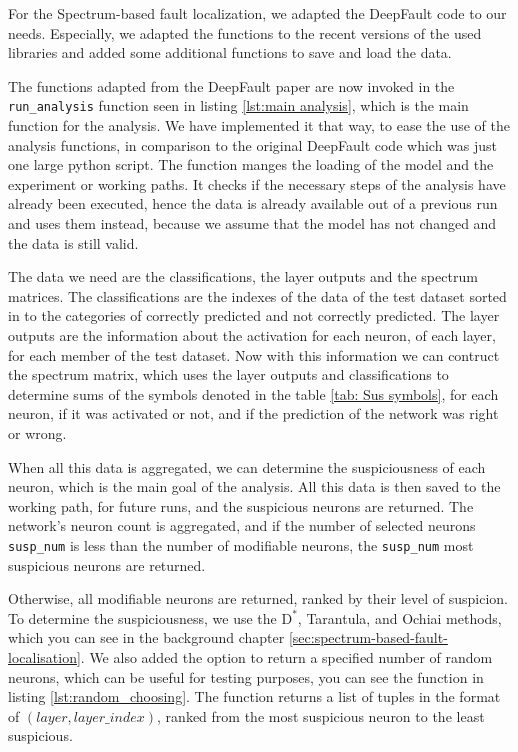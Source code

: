 For the Spectrum-based fault localization, we adapted the DeepFault \cite{eniser_deepfault_2023} code to our needs.
Especially, we adapted the functions to the recent versions of the used libraries and added some additional functions to save and load the data.

The functions adapted from the DeepFault paper are now invoked in the \texttt{run\_analysis} function seen in listing \ref{lst:main analysis}, which is the main function for the analysis.
We have implemented it that way, to ease the use of the analysis functions, in comparison to the original DeepFault code which was just one large python script.
The function manges the loading of the model and the experiment or working paths.
It checks if the necessary steps of the analysis have already been executed, hence the data is already available out of a previous run and uses them instead, because we assume that the model has not changed and the data is still valid.

The data we need are the classifications, the layer outputs and the spectrum matrices.
The classifications are the indexes of the data of the test dataset sorted in to the categories of correctly predicted and not correctly predicted.
The layer outputs are the information about the activation for each neuron, of each layer, for each member of the test dataset.
Now with this information we can contruct the spectrum matrix, which uses the layer outputs and classifications to determine sums of the symbols denoted in the table \ref{tab: Sus symbols}, for each neuron, if it was activated or not, and if the prediction of the network was right or wrong.

When all this data is aggregated, we can determine the suspiciousness of each neuron, which is the main goal of the analysis.
All this data is then saved to the working path, for future runs, and the suspicious neurons are returned.
The network's neuron count is aggregated, and if the number of selected neurons \texttt{susp\_num} is less than the number of modifiable neurons, the \texttt{susp\_num} most suspicious neurons are returned.

Otherwise, all modifiable neurons are returned, ranked by their level of suspicion.
To determine the suspiciousness, we use the $\text{D}^*$, Tarantula, and Ochiai methods, which you can see in the background chapter \ref{sec:spectrum-based-fault-localisation}.
We also added the option to return a specified number of random neurons, which can be useful for testing purposes, you can see the function in listing \ref{lst:random_choosing}.
The function returns a list of tuples in the format of $(layer, layer\_index)$, ranked from the most suspicious neuron to the least suspicious.

